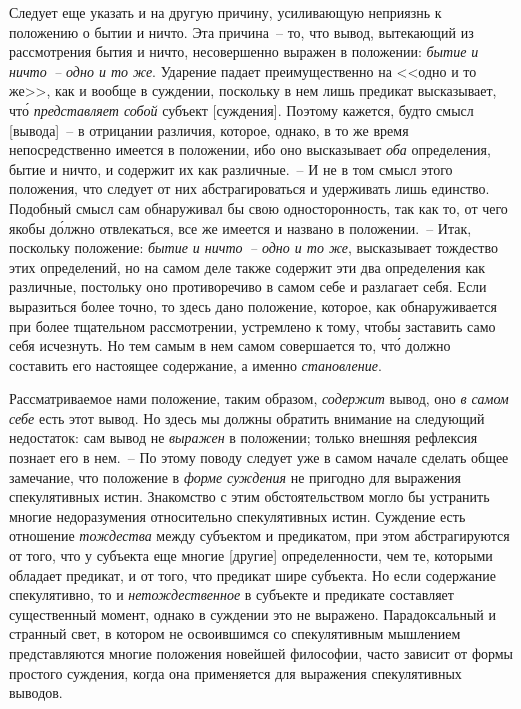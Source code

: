 Следует еще указать и на другую причину, усиливающую
неприязнь к положению о бытии и ничто. Эта причина~-- то,
что вывод, вытекающий из рассмотрения бытия
и ничто, несовершенно выражен в положении: \emph{бытие
и ничто~-- одно и то же}. Ударение падает преимущественно
на <<одно и то же>>, как и вообще в суждении, поскольку
в нем лишь предикат высказывает, чт\'о \emph{представляет
собой} субъект [суждения]. Поэтому кажется, будто смысл
[вывода]~-- в отрицании различия, которое, однако, в то
же время непосредственно имеется в положении, ибо оно
высказывает \emph{оба} определения, бытие и ничто, и содержит
их как различные.~-- И не в том смысл этого положения,
что следует от них абстрагироваться и удерживать лишь
единство. Подобный смысл сам обнаруживал бы свою односторонность,
так как то, от чего якобы д\'олжно отвлекаться,
все же имеется и названо в положении.~-- Итак,
поскольку положение: \emph{бытие и ничто~-- одно и то же}, высказывает
тождество этих определений, но на самом деле
также содержит эти два определения как различные, постольку
оно противоречиво в самом себе и разлагает себя.
Если выразиться более точно, то здесь дано положение,
которое, как обнаруживается при более тщательном
рассмотрении, устремлено к тому, чтобы заставить само
себя исчезнуть. Но тем самым в нем самом совершается
то, чт\'о должно составить его настоящее содержание, а
именно \emph{становление}.

Рассматриваемое нами положение, таким образом, \emph{содержит}
вывод, оно \emph{в самом себе} есть этот вывод. Но здесь
мы должны обратить внимание на следующий недостаток:
сам вывод не \emph{выражен} в положении; только внешняя рефлексия
познает его в нем.~-- По этому поводу следует
уже в самом начале сделать общее замечание, что положение
в \emph{форме суждения} не пригодно для выражения
спекулятивных истин. Знакомство с этим обстоятельством
могло бы устранить многие недоразумения относительно
спекулятивных истин. Суждение есть отношение \emph{тождества}
между субъектом и предикатом, при этом абстрагируются
от того, что у субъекта еще многие [другие] определенности,
чем те, которыми обладает предикат, и от
того, что предикат шире субъекта. Но если содержание спекулятивно,
то и \emph{нетождественное} в субъекте и предикате
составляет существенный момент, однако в суждении это
не выражено. Парадоксальный и странный свет, в котором
не освоившимся со спекулятивным мышлением представляются
многие положения новейшей философии, часто
зависит от формы простого суждения, когда она применяется
для выражения спекулятивных выводов.

